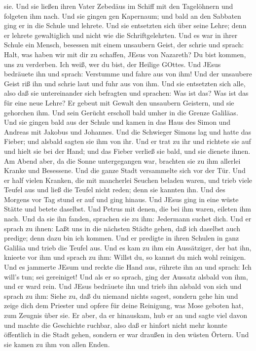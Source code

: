 sie.  Und sie ließen ihren Vater Zebedäus im Schiff mit den
Tagelöhnern und folgeten ihm nach.  Und sie gingen gen
Kapernaum; und bald an den Sabbaten ging er in die Schule und lehrete.
 Und sie entsetzten sich über seine Lehre; denn er lehrete
gewaltiglich und nicht wie die Schriftgelehrten.  Und es
war in ihrer Schule ein Mensch, besessen mit einem unsaubern Geist, der
schrie  und sprach: Halt, was haben wir mit dir zu
schaffen, JEsus von Nazareth? Du bist kommen, uns zu verderben. Ich
weiß, wer du bist, der Heilige GOttes.  Und JEsus bedräuete
ihn und sprach: Verstumme und fahre aus von ihm!  Und der
unsaubere Geist riß ihn und schrie laut und fuhr aus von ihm.
 Und sie entsetzten sich alle, also daß sie untereinander
sich befragten und sprachen: Was ist das? Was ist das für eine neue
Lehre? Er gebeut mit Gewalt den unsaubern Geistern, und sie gehorchen
ihm.  Und sein Gerücht erscholl bald umher in die Grenze
Galiläas.  Und sie gingen bald aus der Schule und kamen in
das Haus des Simon und Andreas mit Jakobus und Johannes. 
Und die Schwieger Simons lag und hatte das Fieber; und alsbald sagten
sie ihm von ihr.  Und er trat zu ihr und richtete sie auf
und hielt sie bei der Hand; und das Fieber verließ sie bald, und sie
dienete ihnen.  Am Abend aber, da die Sonne untergegangen
war, brachten sie zu ihm allerlei Kranke und Besessene. 
Und die ganze Stadt versammelte sich vor der Tür.  Und er
half vielen Kranken, die mit mancherlei Seuchen beladen waren, und trieb
viele Teufel aus und ließ die Teufel nicht reden; denn sie kannten ihn.
 Und des Morgens vor Tag stund er auf und ging hinaus. Und
JEsus ging in eine wüste Stätte und betete daselbst.  Und
Petrus mit denen, die bei ihm waren, eileten ihm nach.  Und
da sie ihn fanden, sprachen sie zu ihm: Jedermann suchet dich.
 Und er sprach zu ihnen: Laßt uns in die nächsten Städte
gehen, daß ich daselbst auch predige; denn dazu bin ich kommen.
 Und er predigte in ihren Schulen in ganz Galiläa und trieb
die Teufel aus.  Und es kam zu ihm ein Aussätziger, der bat
ihn, knieete vor ihm und sprach zu ihm: Willst du, so kannst du mich
wohl reinigen.  Und es jammerte JEsum und reckte die Hand
aus, rührete ihn an und sprach: Ich will's tun; sei gereiniget!
 Und als er so sprach, ging der Aussatz alsbald von ihm,
und er ward rein.  Und JEsus bedräuete ihn und trieb ihn
alsbald von sich  und sprach zu ihm: Siehe zu, daß du
niemand nichts sagest, sondern gehe hin und zeige dich dem Priester und
opfere für deine Reinigung, was Mose geboten hat, zum Zeugnis über sie.
 Er aber, da er hinauskam, hub er an und sagte viel davon
und machte die Geschichte ruchbar, also daß er hinfort nicht mehr konnte
öffentlich in die Stadt gehen, sondern er war draußen in den wüsten
Örtern. Und sie kamen zu ihm von allen Enden.

